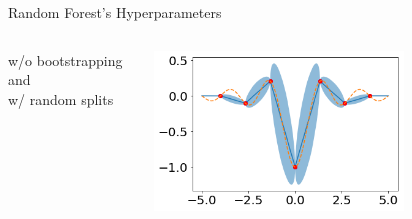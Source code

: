 \begin{frame}[c,fragile]{Random Forest's Hyperparameters}
\begin{columns}
	
	w/o bootstrapping and\\ w/ random splits
	
	\includegraphics[width=0.7\textwidth]{images/rf_noboot_rand_split.png}
	
\end{columns}

\end{frame}
